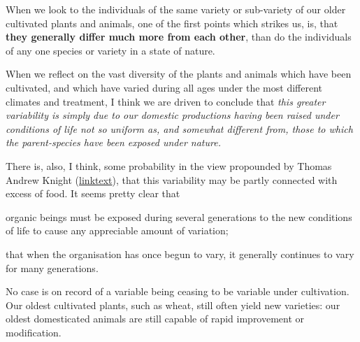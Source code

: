 When we look to the individuals of the same variety or sub-variety of our older cultivated plants and animals, one of the first points which strikes us, is, that \textbf{they generally differ much more from each other}, than do the individuals of any one species or variety in a state of nature.

When we reflect on the vast diversity of the plants and animals which have been cultivated, and which have varied during all ages under the most different climates and treatment, I think we are driven to conclude that \textit{this greater variability is simply due to our domestic productions having been raised under conditions of life not so uniform as, and somewhat different from, those to which the parent-species have been exposed under nature.}

There is, also, I think, some probability in the view propounded by Thomas Andrew Knight (\href{Wikipedia}{linktext}), that this variability may be partly connected with excess of food. It seems pretty clear that

organic beings must be exposed during several generations to the new conditions of life to cause any appreciable amount of variation;

that when the organisation has once begun to vary, it generally continues to vary for many generations.

No case is on record of a variable being ceasing to be variable under cultivation. Our oldest cultivated plants, such as wheat, still often yield new varieties: our oldest domesticated animals are still capable of rapid improvement or modification.
